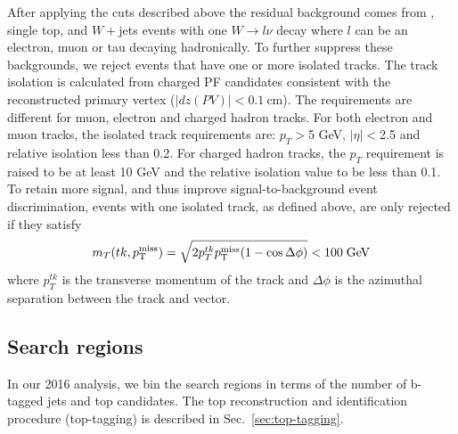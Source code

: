 \begin{itemize}
After applying the cuts described above
the residual background comes from
\ttbar, single top, and $W+$jets events with one $W\rightarrow l\nu$
decay where $l$ can be an electron, muon or tau decaying hadronically. 
To further suppress these backgrounds, we reject events 
that have one or more isolated tracks. The track isolation
is calculated from charged PF candidates consistent with the 
reconstructed primary vertex ($|dz(PV)|<0.1~\mathrm{cm}$).
The requirements are different for muon, electron and charged hadron tracks.
For both electron and muon tracks, the isolated track requirements are: 
$p_{T}>$5 GeV, $|\eta|<$2.5 and relative isolation less than 0.2.
For charged hadron tracks, the $p_{T}$ requirement
is raised to be at least 10 GeV and the relative isolation value to be less 
than 0.1. To retain more signal, and thus improve signal-to-background
event discrimination, events with one isolated track, as defined
above, are only rejected if they satisfy
  \begin{equation}
    \label{eq:mt_isotk}
    m_T(tk,p^{\rm miss}_{\rm T}) = \sqrt{2p_{T}^{tk}p^{\rm miss}_{\rm T}(1-\cos\Delta\phi)}<100\;\mathrm{GeV}
  \end{equation}
  where $p_{T}^{tk}$ is the transverse momentum of the track and
  $\Delta\phi$ is the azimuthal separation between the track and \MET
  vector. 

\end{itemize}

\subsection{Search regions}
\label{sec:searchregions}

In our 2016 analysis, we bin the search regions in terms of the number of b-tagged jets and top candidates. 
The top reconstruction and identification procedure (top-tagging) 
is described in Sec.~\ref{sec:top-tagging}. 

